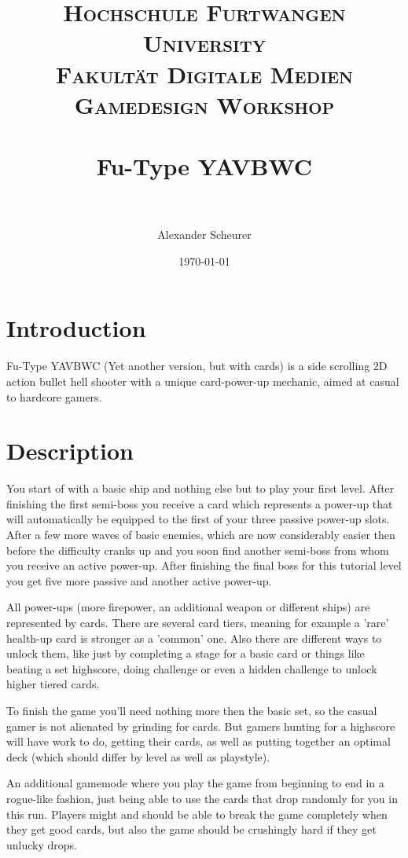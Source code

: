 \documentclass[paper=a4, fontsize=12pt]{scrartcl} %
\title{	
\normalfont \normalsize 
\textsc{Hochschule Furtwangen University\\Fakultät Digitale Medien\\Gamedesign Workshop} \\ %
\horrule{2pt} \\[0.4cm] %
\huge Fu-Type YAVBWC \\ %
\horrule{2pt} \\[0.5cm] %
}
\author{Alexander Scheurer}
\date{\normalsize\today} %
\numberwithin{equation}{section} %
\numberwithin{figure}{section} %
\numberwithin{table}{section} %
\begin{document}
\maketitle %


\section{Introduction}

Fu-Type YAVBWC (Yet another version, but with cards) is a side scrolling 2D action bullet hell shooter with a unique card-power-up mechanic, aimed at casual to hardcore gamers.


\section{Description}

You start of with a basic ship and nothing else but to play your first level. After finishing the first semi-boss you receive a card which represents a power-up that will automatically be equipped to the first of your three passive power-up slots. After a few more waves of basic enemies, which are now considerably easier then before the difficulty cranks up and you soon find another semi-boss from whom you receive an active power-up. After finishing the final boss for this tutorial level you get five more passive and another active power-up.

All power-ups (more firepower, an additional weapon or different ships) are represented by cards. There are several card tiers, meaning for example a 'rare'  health-up card is stronger as a 'common' one. Also there are different ways to unlock them, like just by completing a stage for a basic card or things like beating a set highscore, doing challenge or even a hidden challenge to unlock higher tiered cards.

To finish the game you'll need nothing more then the basic set, so the casual gamer is not alienated by grinding for cards. But gamers hunting for a highscore will have work to do, getting their cards, as well as putting together an optimal deck (which should differ by level as well as playstyle).

An additional gamemode where you play the game from beginning to end in a rogue-like fashion, just being able to use the cards that drop randomly for you in this run. Players might and should be able to break the game completely when they get good cards, but also the game should be crushingly hard if they get unlucky drops.
\end{document}
